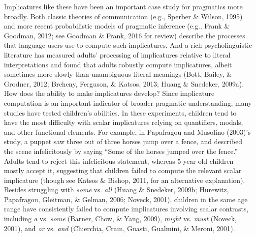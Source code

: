 \documentclass[man]{apa6}
\theoremstyle{definition}
\theoremstyle{definition}
\theoremstyle{definition}
\theoremstyle{remark}
\begin{document}
Implicatures like these have been an important case study for pragmatics
more broadly. Both classic theories of communication (e.g., Sperber \&
Wilson, 1995) and more recent probabilistic models of pragmatic
inference (e.g., Frank \& Goodman, 2012; see Goodman \& Frank, 2016 for
review) describe the processes that language users use to compute such
implicatures. And a rich psycholinguistic literature has measured
adults' processing of implicatures relative to literal interpretations
and found that adults robustly compute implicatures, albeit sometimes
more slowly than unambiguous literal meanings (Bott, Bailey, \& Grodner,
2012; Breheny, Ferguson, \& Katsos, 2013; Huang \& Snedeker, 2009a). How
does the ability to make implicatures develop? Since implicature
computation is an important indicator of broader pragmatic
understanding, many studies have tested children's abilities. In these
experiments, children tend to have the most difficulty with scalar
implicatures relying on quantifiers, modals, and other functional
elements. For example, in Papafragou and Musolino (2003)'s study, a
puppet saw three out of three horses jump over a fence, and described
the scene infelicitously by saying \enquote{Some of the horses jumped
over the fence.} Adults tend to reject this infelicitous statement,
whereas 5-year-old children mostly accept it, suggesting that children
failed to compute the relevant scalar implicature (though see Katsos \&
Bishop, 2011, for an alternative explanation). Besides struggling with
\emph{some} vs. \emph{all} (Huang \& Snedeker, 2009b; Hurewitz,
Papafragou, Gleitman, \& Gelman, 2006; Noveck, 2001), children in the
same age range have consistently failed to compute implicatures
involving scalar contrasts, including \emph{a} vs. \emph{some} (Barner,
Chow, \& Yang, 2009), \emph{might} vs. \emph{must} (Noveck, 2001), and
\emph{or} vs. \emph{and} (Chierchia, Crain, Guasti, Gualmini, \& Meroni,
2001).
\end{document}
